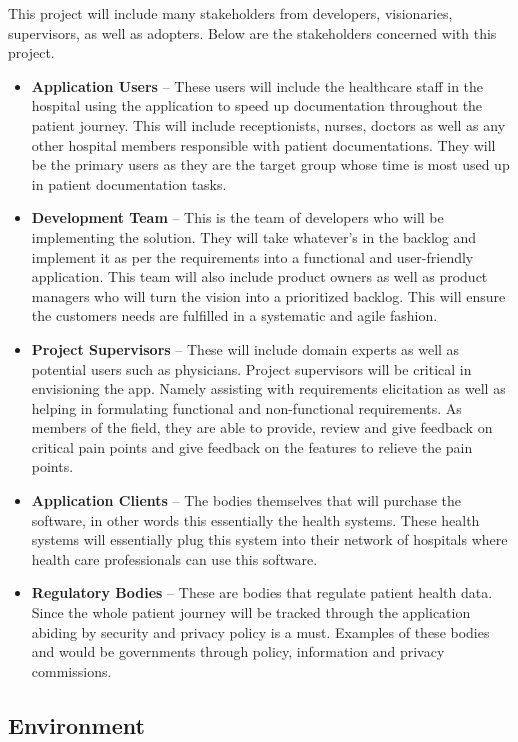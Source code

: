 \documentclass{article}
\begin{document}
This project will include many stakeholders from developers, visionaries, supervisors, as well as adopters. Below are the stakeholders concerned with this project.
\begin{itemize}
    \item \textbf{Application Users} -- These users will include the healthcare staff in the hospital using the application to speed up documentation throughout the patient journey. This will include receptionists, nurses, doctors as well as any other hospital members responsible with patient documentations. They will be the primary users as they are the target group whose time is most used up in patient documentation tasks.
    \item \textbf{Development Team} -- This is the team of developers who will be implementing the solution. They will take whatever’s in the backlog and implement it as per the requirements into a functional and user-friendly application. This team will also include product owners as well as product managers who will turn the vision into a prioritized backlog. This will ensure the customers needs are fulfilled in a systematic and agile fashion.
    \item \textbf{Project Supervisors} -- These will include domain experts as well as potential users such as physicians. Project supervisors will be critical in envisioning the app. Namely assisting with requirements elicitation as well as helping in formulating functional and non-functional requirements. As members of the field, they are able to provide, review and give feedback on critical pain points and give feedback on the features to relieve the pain points.
    \item \textbf{Application Clients} -- The bodies themselves that will purchase the software, in other words this essentially the health systems. These health systems will essentially plug this system into their network of hospitals where health care professionals can use this software.
    \item \textbf{Regulatory Bodies} -- These are bodies that regulate patient health data. Since the whole patient journey will be tracked through the application abiding by security and privacy policy is a must. Examples of these bodies and would be governments through policy, information and privacy commissions.
\end{itemize}

\subsection{Environment}
\end{document}
